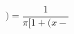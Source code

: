 \documentclass[preview]{standalone}
\begin{document}
\begin{align*}
) = \dfrac{1}{\pi \bigl[1 + (x -}
\end{align*}
\end{document}
